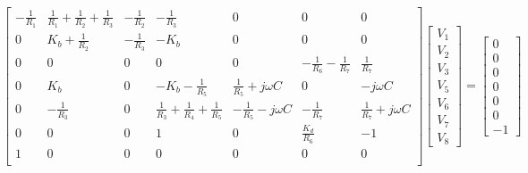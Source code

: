 \[
  \begin{bmatrix}
    - \frac{1}{R_1} & \frac{1}{R_1} + \frac{1}{R_2} + \frac{1}{R_3} & -\frac{1}{R_2} & -\frac{1}{R_3}                                & 0                          & 0                              & 0                          \\
    0               & K_b + \frac{1}{R_2}                           & -\frac{1}{R_3} & - K_b                                         & 0                          & 0                              & 0                          \\
    0               & 0                                             & 0              & 0                                             & 0                          & -\frac{1}{R_6} - \frac{1}{R_7} & \frac{1}{R_7}              \\
    0               & K_b                                           & 0              & -K_b - \frac{1}{R_5}                          & \frac{1}{R_5} + j\omega C  & 0                              & -j\omega C                 \\
    0               & -\frac{1}{R_3}                                & 0              & \frac{1}{R_3} + \frac{1}{R_4} + \frac{1}{R_5} & -\frac{1}{R_5} - j\omega C & -\frac{1}{R_7}                 & \frac{1}{R_7} + j \omega C \\
    0               & 0                                             & 0              & 1                                             & 0                          & \frac{K_d}{R_6}                & -1                         \\
    1               & 0                                             & 0              & 0                                             & 0                          & 0                              & 0                          \\
  \end{bmatrix}
  \begin{bmatrix}
    V_1 \\ V_2 \\ V_3 \\ V_5 \\ V_6 \\ V_7 \\ V_8
  \end{bmatrix}
  =
  \begin{bmatrix}
    0 \\ 0 \\ 0 \\ 0 \\ 0  \\ 0 \\ -1
  \end{bmatrix}
\]

